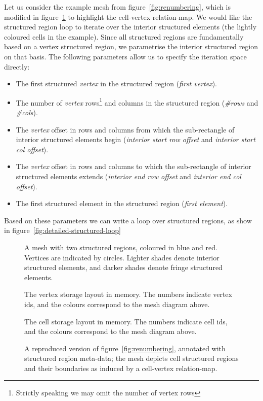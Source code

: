 Let us consider the example mesh from figure~\ref{fig:renumbering}, which is modified in figure~\ref{fig:structured-cell-mesh} to highlight the cell-vertex relation-map. We would like the structured region loop to iterate over the interior structured elements (the lightly coloured cells in the example). Since all structured regions are fundamentally based on a vertex structured region, we parametrise the interior structured region on that basis. The following parameters allow us to specify the iteration space directly:
\begin{itemize}
\item The first structured \emph{vertex} in the structured region (\emph{first vertex}).
\item The number of \emph{vertex} rows\footnote{Strictly speaking we may omit the number of vertex rows} and columns in the structured region (\emph{\#rows} and \emph{\#cols}).
\item The \emph{vertex} offset in rows and columns from which the sub-rectangle of interior structured elements begin (\emph{interior start row offset} and \emph{interior start col offset}).
\item The \emph{vertex} offset in rows and columns to which the sub-rectangle of interior structured elements extends (\emph{interior end row offset} and \emph{interior end col offset}).
\item The first structured element in the structured region (\emph{first element}).
\end{itemize}

Based on these parameters we can write a loop over structured regions, as show in figure~\ref{fig:detailed-structured-loop}


\begin{figure}
\sidebysidethreevertical
{
	
	\caption{A mesh with two structured regions, coloured in blue and red. Vertices are indicated by circles. Lighter shades denote interior structured elements, and darker shades denote fringe structured elements.}
}
{
	\small
	\tabcolsep=0.32mm
	
	\caption{The vertex storage layout in memory. The numbers indicate vertex ids, and the colours correspond to the mesh diagram above.}
}
{
	\small
	\tabcolsep=0.32mm
	
	\caption{The cell storage layout in memory. The numbers indicate cell ids, and the colours correspond to the mesh diagram above.}
}
\caption{A reproduced version of figure~\ref{fig:renumbering}, annotated with structured region meta-data; the mesh depicts cell structured regions and their boundaries as induced by a cell-vertex relation-map.}
\label{fig:structured-cell-mesh}
\end{figure}


